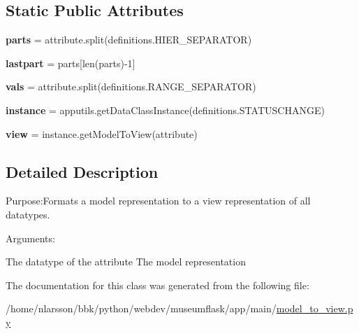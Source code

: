 \subsection*{Static Public Attributes}
\begin{DoxyCompactItemize}
\item 
\mbox{\label{classapp_1_1main_1_1model__to__view_1_1Model__To__View_ad0073ad307c0e193e93933a86bdedde2}} 
{\bfseries parts} = attribute.\+split(definitions.\+H\+I\+E\+R\+\_\+\+S\+E\+P\+A\+R\+A\+T\+OR)
\item 
\mbox{\label{classapp_1_1main_1_1model__to__view_1_1Model__To__View_a21ce3063ed1c03e10bd09dc2d3018d20}} 
{\bfseries lastpart} = parts\mbox{[}len(parts)-\/1\mbox{]}
\item 
\mbox{\label{classapp_1_1main_1_1model__to__view_1_1Model__To__View_a94de482d624c64f0d992a51ba7e1ebe2}} 
{\bfseries vals} = attribute.\+split(definitions.\+R\+A\+N\+G\+E\+\_\+\+S\+E\+P\+A\+R\+A\+T\+OR)
\item 
\mbox{\label{classapp_1_1main_1_1model__to__view_1_1Model__To__View_a6df97d85268e379273f38e3e505c0fca}} 
{\bfseries instance} = apputils.\+get\+Data\+Class\+Instance(definitions.\+S\+T\+A\+T\+U\+S\+C\+H\+A\+N\+GE)
\item 
\mbox{\label{classapp_1_1main_1_1model__to__view_1_1Model__To__View_a0eecdb417dbdfd70e65bde6a5cf3dfda}} 
{\bfseries view} = instance.\+get\+Model\+To\+View(attribute)
\end{DoxyCompactItemize}


\subsection{Detailed Description}
Purpose\+:Formats a model representation to a view representation of all datatypes. 

Arguments\+:

The datatype of the attribute  The model representation 

The documentation for this class was generated from the following file\+:\begin{DoxyCompactItemize}
\item 
/home/nlarsson/bbk/python/webdev/museumflask/app/main/\mbox{\hyperlink{model__to__view_8py}{model\+\_\+to\+\_\+view.\+py}}\end{DoxyCompactItemize}
